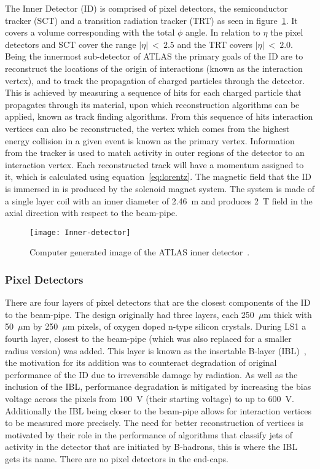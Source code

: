 The Inner Detector (ID) is comprised of pixel detectors, the semiconductor
tracker (SCT) and a transition radiation tracker (TRT) as seen in
figure~\ref{fig:ATLAS-inner-det}. It covers a volume corresponding with the
total $\phi$ angle. In relation to $\eta$ the pixel detectors and SCT cover the
range $|\eta|~<~2.5$ and the TRT covers $|\eta|~<~2.0$. Being the innermost
sub-detector of ATLAS the primary goals of the ID are to reconstruct the
locations of the origin of interactions (known as the interaction vertex), and
to track the propagation of charged particles through the detector. This is
achieved by measuring a sequence of hits for each charged particle that
propagates through its material, upon which reconstruction algorithms can be
applied, known as track finding algorithms. From this sequence of hits
interaction vertices can also be reconstructed, the vertex which comes from the
highest energy collision in a given event is known as the primary vertex.
Information from the tracker is used to match activity in outer regions of the
detector to an interaction vertex. Each reconstructed track will have a momentum
assigned to it, which is calculated using equation~\ref{eq:lorentz}. The
magnetic field that the ID is immersed in is produced by the solenoid magnet
system. The system is made of a single layer coil with an inner diameter of
2.46~m  and produces 2~T field in the axial direction with respect to the
beam-pipe.
\begin{figure}[h]
  \centering
  \texttt{[image: Inner-detector]}
  \caption[ATLAS inner detector]{Computer generated image of the ATLAS inner
    detector~\cite{ATLAS-inner-det}.}%
  \label{fig:ATLAS-inner-det}
\end{figure}

\subsubsection{Pixel Detectors}

There are four layers of pixel detectors that are the closest components of the
ID to the beam-pipe. The design originally had three layers, each 250~$\mu$m
thick with 50~$\mu$m by 250~$\mu$m pixels, of oxygen doped n-type silicon
crystals. During LS1 a fourth layer, closest to the beam-pipe (which was also
replaced for a smaller radius version) was added. This layer is known as the
insertable B-layer (IBL)~\cite{IBL-TDR}, the motivation for its addition was to
counteract degradation of original performance of the ID due to irreversible
damage by radiation. As well as the inclusion of the IBL, performance degradation
is mitigated by increasing the bias voltage across the pixels from 100~V (their
starting voltage) to up to 600~V. Additionally the IBL being closer to the
beam-pipe allows for interaction vertices to be measured more precisely. The
need for better reconstruction of vertices is motivated by their role in the
performance of algorithms that classify jets of activity in the detector that
are initiated by B-hadrons, this is where the IBL gets its name. There are no
pixel detectors in the end-caps.

